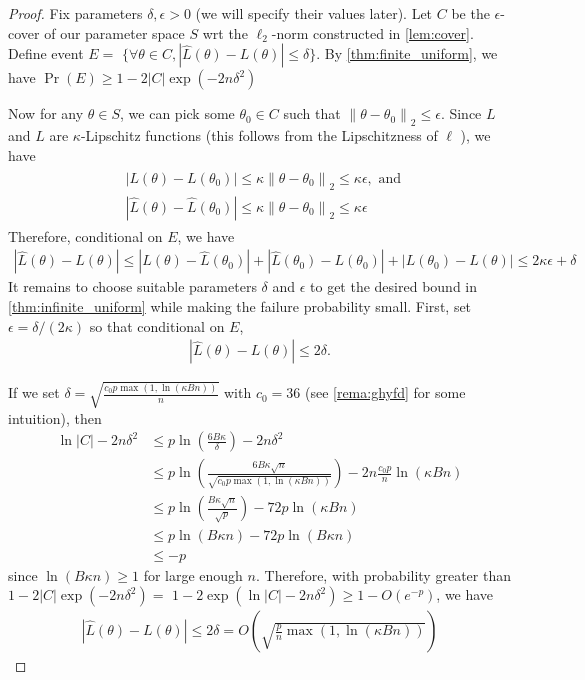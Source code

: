 \documentclass{article}
\begin{document}
\begin{proof}
  Fix parameters $\delta, \epsilon>0$ (we will specify their values later). Let $C$ be the $\epsilon$-cover of our parameter space $S$ \gls{wrt} the $\ell_{2}$-norm constructed in \cref{lem:cover}. Define event $E=$ $\{\forall \theta \in C,|\hat{L}(\theta)-L(\theta)| \leq \delta\} .$ By \cref{thm:finite_uniform}, we have $\operatorname{Pr}(E) \geq 1-2|C| \exp \left(-2 n \delta^{2}\right)$

Now for any $\theta \in S$, we can pick some $\theta_{0} \in C$ such that $\left\|\theta-\theta_{0}\right\|_{2} \leq \epsilon$. Since $L$ and $\widehat{L}$ are $\kappa$-Lipschitz functions (this follows from the Lipschitzness of $\ell$ ), we have
\begin{align*}
\begin{aligned}
&\left|L(\theta)-L\left(\theta_{0}\right)\right| \leq \kappa\left\|\theta-\theta_{0}\right\|_{2} \leq \kappa \epsilon, \text { and } \\
&\left|\hat{L}(\theta)-\hat{L}\left(\theta_{0}\right)\right| \leq \kappa\left\|\theta-\theta_{0}\right\|_{2} \leq \kappa \epsilon
\end{aligned}
\end{align*}
Therefore, conditional on $E$, we have
\begin{align*}
|\hat{L}(\theta)-L(\theta)| \leq\left|\hat{L}(\theta)-\hat{L}\left(\theta_{0}\right)\right|+\left|\hat{L}\left(\theta_{0}\right)-L\left(\theta_{0}\right)\right|+\left|L\left(\theta_{0}\right)-L(\theta)\right| \leq 2 \kappa \epsilon+\delta
\end{align*}
It remains to choose suitable parameters $\delta$ and $\epsilon$ to get the desired bound in \cref{thm:infinite_uniform} while making the failure probability small. First, set $\epsilon=\delta /(2 \kappa)$ so that conditional on $E$,
\begin{align}
|\hat{L}(\theta)-L(\theta)| \leq 2 \delta .\label{eq:hnieqd}
\end{align}

If we set $\delta=\sqrt{\frac{c_{0} p \max (1, \ln (\kappa B n))}{n}}$ with $c_{0}=36$ (see \cref{rema:ghyfd} for some intuition), then
\begin{align}
\ln |C|-2 n \delta^{2} & \leq p \ln \left(\frac{6 B \kappa}{\delta}\right)-2 n \delta^{2} \label{eq:hkz1}\\
& \leq p \ln \left(\frac{6 B \kappa \sqrt{n}}{\sqrt{c_{0} p \max (1, \ln (\kappa B n))}}\right)-2 n \frac{c_{0} p}{n} \ln (\kappa B n) \\
& \leq p \ln \left(\frac{B \kappa \sqrt{n}}{\sqrt{p}}\right)-72 p \ln (\kappa B n) \\
& \leq p \ln (B \kappa n)-72 p \ln (B \kappa n) \label{eq:mxnbdee}\\
& \leq-p
\end{align}
since $\ln (B \kappa n) \geq 1$ for large enough $n .$ Therefore, with probability greater than $1-2|C| \exp \left(-2 n \delta^{2}\right)=$ $1-2 \exp \left(\ln |C|-2 n \delta^{2}\right) \geq 1-O\left(e^{-p}\right)$, we have
\begin{align*}
|\hat{L}(\theta)-L(\theta)| \leq 2 \delta=O\left(\sqrt{\frac{p}{n} \max (1, \ln (\kappa B n))}\right)
\end{align*}
\end{proof}
\end{document}

